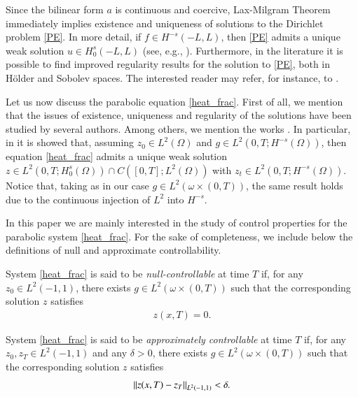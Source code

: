 Since the bilinear form $a$ is continuous and coercive, Lax-Milgram Theorem immediately implies existence and uniqueness of solutions to the Dirichlet problem \eqref{PE}. In more detail, if $f\in H^{-s}(-L,L)$, then \eqref{PE} admits a unique weak solution $u\in H_0^s(-L,L)$ (see, e.g., \cite[Proposition 2.1]{biccari2017local}). Furthermore, in the literature it is possible to find improved regularity results for the solution to \eqref{PE}, both in H\"older and Sobolev spaces. The interested reader may refer, for instance, to \cite{acosta2017fractional,biccari2017local,leonori2015basic,ros2014dirichlet,ros2014extremal}.

Let us now discuss the parabolic equation \eqref{heat_frac}. First of all, we mention that the issues of existence, uniqueness and regularity of the solutions have been studied by several authors. Among others, we mention the works \cite{biccari2017parabolic,fernandez2016boundary,leonori2015basic}. In particular, in \cite[Theorem 26]{leonori2015basic} it is showed that, assuming $z_0\in L^2(\Omega)$ and $g\in L^2(0,T;H^{-s}(\Omega))$, then equation \eqref{heat_frac} admits a unique weak solution $z\in L^2(0,T;H_0^s(\Omega))\cap C([0,T];L^2(\Omega))$ with $z_t\in L^2(0,T;H^{-s}(\Omega))$. Notice that, taking as in our case $g\in L^2(\omega\times(0,T))$, the same result holds due to the continuous injection of $L^2$ into $H^{-s}$.

In this paper we are mainly interested in the study of control properties for the parabolic system \eqref{heat_frac}. For the sake of completeness, we include below the definitions of null and approximate controllability.

\begin{definition}
	System \eqref{heat_frac} is said to be \textit{null-controllable} at time $T$ if, for any $z_0\in L^2(-1,1)$, there exists $g\in L^2(\omega\times(0,T))$ such that the corresponding solution $z$ satisfies 
	\begin{align*}
		z(x,T)=0.
	\end{align*}
\end{definition}

\begin{definition}
	System \eqref{heat_frac} is said to be \textit{approximately controllable} at time $T$ if, for any $z_0,z_T\in L^2(-1,1)$ and any $\delta>0$, there exists $g\in L^2(\omega\times(0,T))$ such that the corresponding solution $z$ satisfies \begin{align*}
		{\left\|z(x,T)-z_T\right\|}_{L^2(-1,1)}<\delta.
	\end{align*}
\end{definition}

